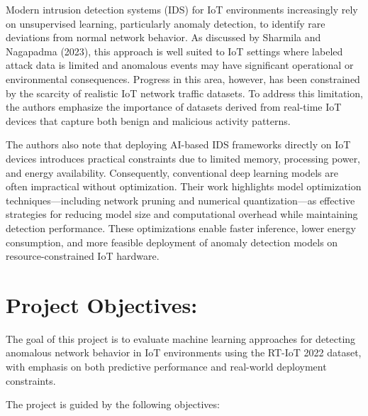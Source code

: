 \documentclass[
  8pt,
  letterpaper,
  DIV=11,
  numbers=noendperiod]{scrreprt}
\begin{document}
Modern intrusion detection systems (IDS) for IoT environments
increasingly rely on unsupervised learning, particularly anomaly
detection, to identify rare deviations from normal network behavior. As
discussed by Sharmila and Nagapadma (2023), this approach is well suited
to IoT settings where labeled attack data is limited and anomalous
events may have significant operational or environmental consequences.
Progress in this area, however, has been constrained by the scarcity of
realistic IoT network traffic datasets. To address this limitation, the
authors emphasize the importance of datasets derived from real-time IoT
devices that capture both benign and malicious activity patterns.

The authors also note that deploying AI-based IDS frameworks directly on
IoT devices introduces practical constraints due to limited memory,
processing power, and energy availability. Consequently, conventional
deep learning models are often impractical without optimization. Their
work highlights model optimization techniques---including network
pruning and numerical quantization---as effective strategies for
reducing model size and computational overhead while maintaining
detection performance. These optimizations enable faster inference,
lower energy consumption, and more feasible deployment of anomaly
detection models on resource-constrained IoT hardware.

\section{Project Objectives:}\label{project-objectives}

The goal of this project is to evaluate machine learning approaches for
detecting anomalous network behavior in IoT environments using the
RT-IoT 2022 dataset, with emphasis on both predictive performance and
real-world deployment constraints.

The project is guided by the following objectives:
\end{document}
